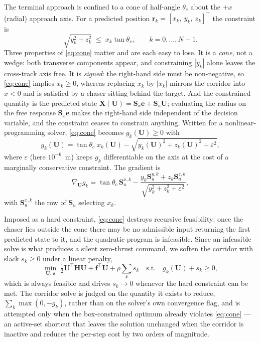 The terminal approach is confined to a cone of half-angle $\theta_c$ about the
$+x$ (radial) approach axis. For a predicted position
$\mathbf{r}_k = [x_k,\ y_k,\ z_k]^{\top}$ the constraint is
\begin{equation}
\sqrt{y_k^2 + z_k^2} \;\le\; x_k \tan\theta_c ,
\qquad k = 0,\dots,N-1 .
\label{eq:cone}
\end{equation}
Three properties of \eqref{eq:cone} matter and are each easy to lose. It is a
\emph{cone}, not a wedge: both transverse components appear, and constraining
$|y_k|$ alone leaves the cross-track axis free. It is \emph{signed}: the
right-hand side must be non-negative, so \eqref{eq:cone} implies
$x_k \ge 0$, whereas replacing $x_k$ by $|x_k|$ mirrors the corridor into
$x < 0$ and is satisfied by a chaser sitting behind the target. And the
constrained quantity is the predicted state
$\mathbf{X}(\mathbf{U}) = \mathbf{S}_x \mathbf{e} + \mathbf{S}_u \mathbf{U}$;
evaluating the radius on the free response $\mathbf{S}_x\mathbf{e}$ makes the
right-hand side independent of the decision variable, and the constraint
ceases to constrain anything. Written for a nonlinear-programming solver,
\eqref{eq:cone} becomes
$g_k(\mathbf{U}) \ge 0$ with
\begin{equation}
g_k(\mathbf{U}) = \tan\theta_c \; x_k(\mathbf{U})
   - \sqrt{y_k(\mathbf{U})^2 + z_k(\mathbf{U})^2 + \varepsilon^2},
\label{eq:cone_g}
\end{equation}
where $\varepsilon$ (here $10^{-6}$~m) keeps $g_k$ differentiable on the axis
at the cost of a marginally conservative constraint. The gradient is
\begin{equation}
\nabla_{\mathbf{U}} g_k = \tan\theta_c \, \mathbf{S}_u^{x,k}
 - \frac{y_k \mathbf{S}_u^{y,k} + z_k \mathbf{S}_u^{z,k}}
        {\sqrt{y_k^2 + z_k^2 + \varepsilon^2}} ,
\label{eq:cone_grad}
\end{equation}
with $\mathbf{S}_u^{x,k}$ the row of $\mathbf{S}_u$ selecting $x_k$.

Imposed as a hard constraint, \eqref{eq:cone} destroys recursive feasibility:
once the chaser lies outside the cone there may be no admissible input
returning the first predicted state to it, and the quadratic program is
infeasible. Since an infeasible solve is what produces a silent zero-thrust
command, we soften the corridor with slack $s_k \ge 0$ under a linear penalty,
\begin{equation}
\min_{\mathbf{U},\,\mathbf{s}} \;
\tfrac{1}{2}\mathbf{U}^{\top}\mathbf{H}\mathbf{U} + \mathbf{f}^{\top}\mathbf{U}
+ \rho \sum_{k} s_k
\quad \text{s.t.} \quad g_k(\mathbf{U}) + s_k \ge 0 ,
\label{eq:cone_soft}
\end{equation}
which is always feasible and drives $s_k \to 0$ whenever the hard constraint
can be met. The corridor solve is judged on the quantity it exists to reduce,
$\sum_k \max(0, -g_k)$, rather than on the solver's own convergence flag, and
is attempted only when the box-constrained optimum already violates
\eqref{eq:cone} --- an active-set shortcut that leaves the solution unchanged
when the corridor is inactive and reduces the per-step cost by two orders of
magnitude.
